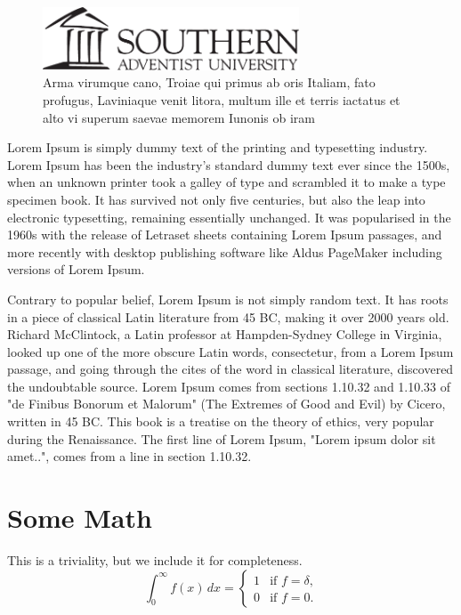 \documentclass[ms,twoside,print]{nuthesis}
\begin{document}
\begin{figure}[h]
  \centering
  \includegraphics[width=3in]{logoBlackH}
  \caption{Arma virumque cano, Troiae qui primus ab oris Italiam, fato profugus,
Laviniaque venit litora, multum ille et terris iactatus et alto vi
superum saevae memorem Iunonis ob iram}
  \label{fig:test}
\end{figure}

Lorem Ipsum is simply dummy text of the printing and typesetting industry. Lorem Ipsum has been the industry's standard dummy text ever since the 1500s, when an unknown printer took a galley of type and scrambled it to make a type specimen book. It has survived not only five centuries, but also the leap into electronic typesetting, remaining essentially unchanged. It was popularised in the 1960s with the release of Letraset sheets containing Lorem Ipsum passages, and more recently with desktop publishing software like Aldus PageMaker including versions of Lorem Ipsum.

Contrary to popular belief, Lorem Ipsum is not simply random text. It has roots in a piece of classical Latin literature from 45 BC, making it over 2000 years old. Richard McClintock, a Latin professor at Hampden-Sydney College in Virginia, looked up one of the more obscure Latin words, consectetur, from a Lorem Ipsum passage, and going through the cites of the word in classical literature, discovered the undoubtable source. Lorem Ipsum comes from sections 1.10.32 and 1.10.33 of "de Finibus Bonorum et Malorum" (The Extremes of Good and Evil) by Cicero, written in 45 BC. This book is a treatise on the theory of ethics, very popular during the Renaissance. The first line of Lorem Ipsum, "Lorem ipsum dolor sit amet..", comes from a line in section 1.10.32.~\cite{lorum}


\chapter{Some Math}\label{chap:math}

This is a triviality, but we include it for completeness.
\begin{equation}
\int_0^\infty f(x) \, dx =
\begin{cases} 1 & \mbox{if $f=\delta$,} \\
0 & \mbox{if $f=0$.} \end{cases}
\end{equation}
\end{document}
